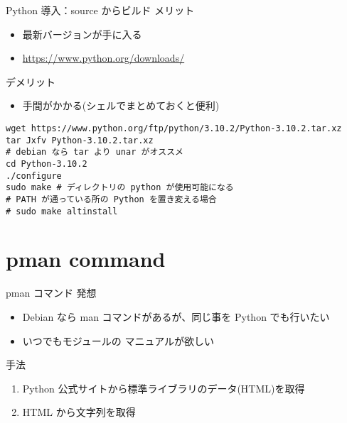 \documentclass[compress,dvipdfmx,11pt]{beamer}
\begin{document}
\begin{frame}[label={sec:orgf651b80},fragile]{Python 導入：source からビルド}
 メリット
\begin{itemize}
\item 最新バージョンが手に入る
\item \url{https://www.python.org/downloads/}
\end{itemize}

デメリット
\begin{itemize}
\item 手間がかかる(シェルでまとめておくと便利)
\end{itemize}
\begin{verbatim}
wget https://www.python.org/ftp/python/3.10.2/Python-3.10.2.tar.xz
tar Jxfv Python-3.10.2.tar.xz
# debian なら tar より unar がオススメ
cd Python-3.10.2
./configure
sudo make # ディレクトリの python が使用可能になる
# PATH が通っている所の Python を置き変える場合
# sudo make altinstall
\end{verbatim}
\end{frame}



\section{pman command}
\label{sec:org3c093c4}
\begin{frame}[label={sec:org217790f}]{pman コマンド}
発想
\begin{itemize}
\item Debian なら man コマンドがあるが、同じ事を Python でも行いたい
\item いつでもモジュールの \alert{マニュアルが欲しい}
\end{itemize}

手法
\begin{enumerate}
\item Python 公式サイトから標準ライブラリのデータ(HTML)を取得
\item HTML から文字列を取得
\end{enumerate}
\end{frame}
\end{document}
